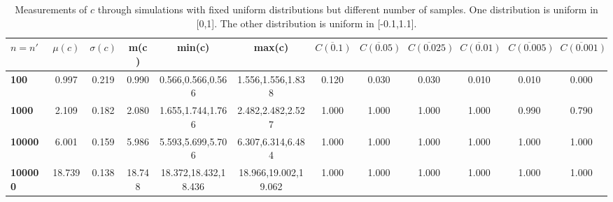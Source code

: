 \begin{table*}[h!]
\begin{center}
\begin{tabular}{| l | c | c | c | c | c | c | c | c | c | c | c |}\hline
$n=n'$ & $\mu(c)$ & $\sigma(c)$ & m(c) & min(c) & max(c) & $\overline{C(0.1)}$ & $\overline{C(0.05)}$ & $\overline{C(0.025)}$ & $\overline{C(0.01)}$ & $\overline{C(0.005)}$ & $\overline{C(0.001)}$ \\\hline\hline
{\bf 100} & 0.997 & 0.219 & 0.990 & 0.566,0.566,0.566 & 1.556,1.556,1.838 & 0.120 & 0.030 & 0.030 & 0.010 & 0.010 & 0.000 \\\hline
{\bf 1000} & 2.109 & 0.182 & 2.080 & 1.655,1.744,1.766 & 2.482,2.482,2.527 & 1.000 & 1.000 & 1.000 & 1.000 & 0.990 & 0.790 \\\hline
{\bf 10000} & 6.001 & 0.159 & 5.986 & 5.593,5.699,5.706 & 6.307,6.314,6.484 & 1.000 & 1.000 & 1.000 & 1.000 & 1.000 & 1.000 \\\hline
{\bf 100000} & 18.739 & 0.138 & 18.748 & 18.372,18.432,18.436 & 18.966,19.002,19.062 & 1.000 & 1.000 & 1.000 & 1.000 & 1.000 & 1.000 \\\hline
\end{tabular}
\caption{Measurements of $c$ through simulations
        with fixed uniform distributions but different number of samples.
        One distribution is uniform in [0,1].
        The other distribution is uniform in [-0.1,1.1].}
\end{center}
\end{table*}